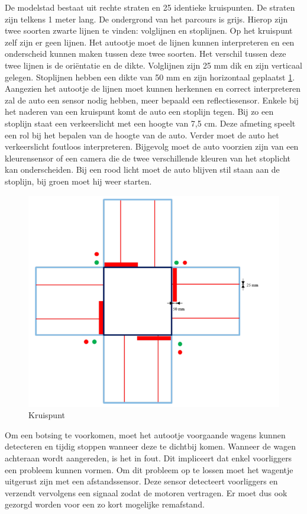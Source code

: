 \documentclass[a4paper,twoside,kulak]{kulakreport} %
\begin{document}
De modelstad bestaat uit rechte straten en 25 identieke kruispunten. De straten zijn telkens 1 meter lang. De ondergrond van het parcours is grijs. Hierop zijn twee soorten zwarte lijnen te vinden: volglijnen en stoplijnen. Op het kruispunt zelf zijn er geen lijnen. Het autootje moet de lijnen kunnen interpreteren en een onderscheid kunnen maken tussen deze twee soorten. Het verschil tussen deze twee lijnen is de oriëntatie en de dikte. Volglijnen zijn 25 mm dik en zijn verticaal gelegen. Stoplijnen hebben een dikte van 50 mm en zijn horizontaal geplaatst \ref{fig:plattegrond}. Aangezien het autootje de lijnen moet kunnen herkennen en correct interpreteren zal de auto een sensor nodig hebben, meer bepaald een reflectiesensor. Enkele bij het naderen van een kruispunt komt de auto een stoplijn tegen. Bij zo een stoplijn staat een verkeerslicht met een hoogte van 7,5 cm. Deze afmeting speelt een rol bij het bepalen van de hoogte van de auto. Verder moet de auto het verkeerslicht foutloos interpreteren. Bijgevolg moet de auto voorzien zijn van een kleurensensor of een camera die de twee verschillende kleuren van het stoplicht kan onderscheiden. Bij een rood licht moet de auto blijven stil staan aan de stoplijn, bij groen moet hij weer starten.

\begin{figure}
	\centering
	\includegraphics[width=.6\textwidth]{volglijnenEnStoplijnen}
	\caption{Kruispunt}
	\label{fig:plattegrond}
\end{figure}

Om een botsing te voorkomen, moet het autootje voorgaande wagens kunnen detecteren en tijdig stoppen wanneer deze te dichtbij komen. Wanneer de wagen achteraan wordt aangereden, is het in fout. Dit impliceert dat enkel voorliggers een probleem kunnen vormen. Om dit probleem op te lossen moet het wagentje uitgerust zijn met een afstandssensor. Deze sensor detecteert voorliggers en verzendt vervolgens een signaal zodat de motoren vertragen. Er moet dus ook gezorgd worden voor een zo kort mogelijke remafstand. %
\end{document}
